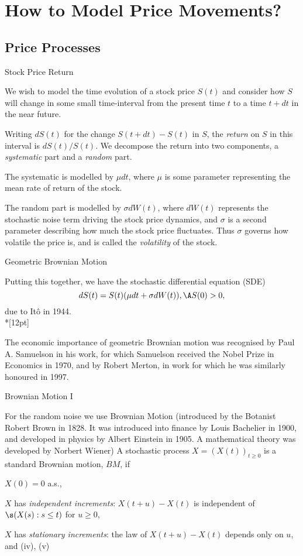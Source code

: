 \section{How to Model Price Movements?}
\subsection{Price Processes}

{Stock Price Return}
\item<1-> We wish to model the time evolution of a stock price
$S(t)$ and consider how $S$
will change in some small time-interval from the present time $t$
to a time $t+dt$ in the near future.
\item<2-> Writing $dS(t)$ for the
change $S(t+dt)-S(t)$ in $S$, the {\it return} on $S$ in this
interval is $dS(t)/S(t)$.
We decompose the return into two components, a {\it systematic}
part and a {\it random} part.
\item<3-> The systematic is modelled by $\mu dt$, where $\mu$ is some parameter
representing the mean rate of return of the stock.
\item<4->
The random part is modelled by $\sigma dW(t)$, where $dW(t)$
represents the stochastic noise term driving the stock price dynamics, and
$\sigma$ is a second parameter describing how much the stock price fluctuates. Thus $\sigma$
governs how volatile the price is, and is called the {\it
volatility} of the
stock.

{Geometric Brownian Motion}

Putting this together, we have the stochastic differential
equation (SDE)
\begin{equation}\label{GBM}
dS(t) = S(t) (\mu dt + \sigma dW(t)), \A S(0) > 0,
\end{equation}
due to It\^{o} in 1944.\\*[12pt]

The economic importance of geometric
Brownian motion was recognised by Paul A. Samuelson in his work, for which Samuelson received the Nobel
Prize in Economics in 1970, and by Robert Merton, in work for which he was similarly
honoured in 1997.

{Brownian Motion I}
\item<1-> For the random noise we use Brownian Motion (introduced by the Botanist Robert Brown in
1828. It was introduced into finance by Louis Bachelier in 1900, and developed in physics by Albert Einstein in 1905.
A mathematical theory was developed by Norbert Wiener)
A stochastic process $X=(X(t))_{t \geq 0}$ is a standard
Brownian motion, $BM$, if
\item[(i)] $X(0) = 0$ a.s., \item[(ii)] $X$ has {\it independent
increments}: $X(t+u) - X(t)$ is independent of $\s (X(s): s \leq
t)$ for $u \geq 0$, \item[(iii)]  $X$ has {\it stationary
increments}: the law of $X(t+u) - X(t)$ depends only on $u$,
and (iv), (v)

